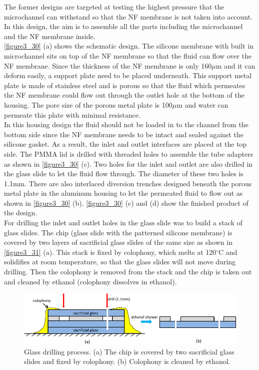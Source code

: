 The former designs are targeted at testing the highest pressure that the microchannel can withstand so that the NF membrane is not taken into account. In this design, the aim is to assemble all the parts including the microchannel and the NF membrane inside. \\

\autoref{figure3_30} (a) shows the schematic design. The silicone membrane with built in microchannel sits on top of the NF membrane so that the fluid can flow over the NF membrane. Since the thickness of the NF membrane is only 160$\mu$m and it can deform easily, a support plate need to be placed underneath. This support metal plate is made of stainless steel and is porous so that the fluid which permeates the NF membrane could flow out through the outlet hole at the bottom of the housing. The pore size of the porous metal plate is 100$\mu$m and water can permeate this plate with minimal resistance.\\

In this housing design the fluid should not be loaded in to the channel from the bottom side since the NF membrane needs to be intact and sealed against the silicone gasket. As a result, the inlet and outlet interfaces are placed at the top side. The PMMA lid is drilled with threaded holes to assemble the tube adapters as shown in \autoref{figure3_30} (c). Two holes for the inlet and outlet are also drilled in the glass slide to let the fluid flow through. The diameter of these two holes is 1.1mm. There are also interlaced diversion trenches designed beneath the porous metal plate in the aluminum housing to let the permeated fluid to flow out as shown in \autoref{figure3_30} (b). \autoref{figure3_30} (c) and (d) show the finished product of the design.\\ 

For drilling the inlet and outlet holes in the glass slide was to build a stack of glass slides. The chip (glass slide with the patterned silicone membrane) is covered by two layers of sacrificial glass slides of the same size as shown in \autoref{figure3_31} (a). This stack is fixed by colophony, which melts at 120$^\circ$C and solidifies at room temperature, so that the glass slides will not move during drilling. Then the colophony is removed from the stack and the chip is taken out and cleaned by ethanol (colophony dissolves in ethanol).

\begin{figure}[!t]%
\centering
\includegraphics[width=1\textwidth]{figures/designandfabrication/figure3_31}%
\caption{Glass drilling process. (a) The chip is covered by two sacrificial glass slides and fixed by colophony. (b) Colophony is cleaned by ethanol.}%
\label{figure3_31}%
\end{figure}

